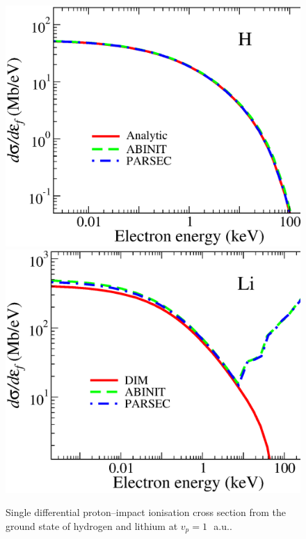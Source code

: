 \documentclass[10pt]{article}
\begin{document}
\begin{figure}[H]
\centering
 \includegraphics[height=0.225\textheight]{figures/pseudopot/ionizationH.eps}
 \hspace{0.2cm}
 \includegraphics[height=0.225\textheight]{figures/pseudopot/ionizationLi.eps}
 \caption{Single differential proton--impact ionisation cross 
 section from the ground state of hydrogen and lithium at 
 \mbox{$v_p=1$\, a.u..}}
 \label{fig:ionHLi}
\end{figure}

\end{document}
